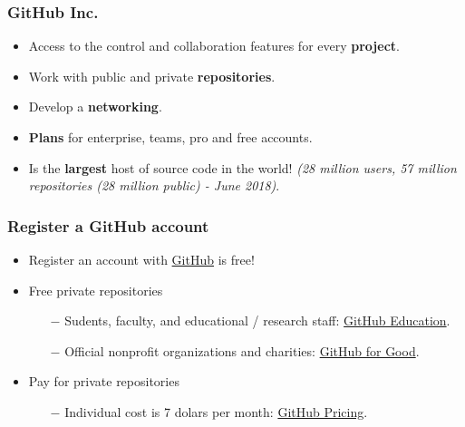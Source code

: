 \documentclass[svgnames]{beamer}
\begin{document}
\begin{frame}
    \frametitle{GitHub Inc.}
    \begin{itemize}
        \item Access to the control and collaboration features for every \textbf{project}. \hfill \break
        \item Work with public and private \textbf{repositories}. \hfill \break
        \item Develop a \textbf{networking}. \hfill \break
        \item \textbf{Plans} for enterprise, teams, pro and free accounts. \hfill \break
        \item Is the \textbf{largest} host of source code in the world! \emph{(28 million users, 57 million repositories (28 million public) - June 2018)}.
    \end{itemize}
\end{frame}


\begin{frame}
    \frametitle{Register a GitHub account}
    \begin{itemize}
        \item Register an account with \href{https://github.com/}{\faStar GitHub} is free! \hfill \break
        \item Free private repositories
            \begin{itemize}
                \item[$-$] Sudents, faculty, and educational / research staff: \href{https://education.github.com/}{\faStar GitHub Education}.
                \item[$-$] Official nonprofit organizations and charities: \href{https://github.com/nonprofit}{\faStar GitHub for Good}.
                    \hfill \break
            \end{itemize}
        \item Pay for private repositories
            \begin{itemize}
                \item[$-$] Individual cost is 7 dolars per month: \href{https://github.com/pricing}{\faStar GitHub Pricing}.
            \end{itemize}

    \end{itemize}
\end{frame}
\end{document}
